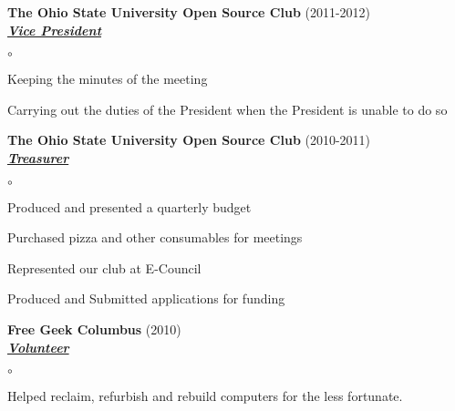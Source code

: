 \documentclass{article}
\newcommand{\organization}[3]{{ \textbf{#1} (#2)\\ \underline{\textbf{\emph{#3}}}\\  }}
\newenvironment{achievements}{\begin{list}{$\circ$}{\topsep 0pt \itemsep -2pt}}{\vspace*{4pt}\end{list}}
\begin{document}
\organization{The Ohio State University Open Source Club}{2011-2012}{Vice President}
	\begin{achievements}
	\item Keeping the minutes of the meeting
	\item Carrying out the duties of the President when the President is unable to do so
	\end{achievements}

\organization{The Ohio State University Open Source Club}{2010-2011}{Treasurer}
	\begin{achievements}
	\item Produced and presented a quarterly budget
	\item Purchased pizza and other consumables for meetings
	\item Represented our club at E-Council
	\item Produced and Submitted applications for funding	
	\end{achievements}

\organization{Free Geek Columbus}{2010}{Volunteer}
	\begin{achievements}
	\item Helped reclaim, refurbish and rebuild computers for the less fortunate.
	\end{achievements}
\end{document}
